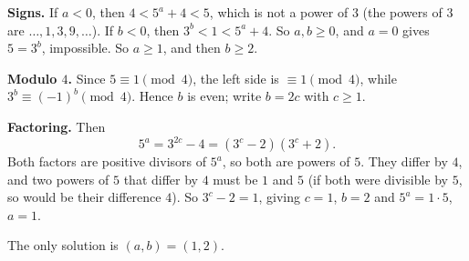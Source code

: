 \textbf{Signs.} If $a<0$, then $4<5^a+4<5$, which is not a power of $3$ (the powers of $3$ are $\dots,1,3,9,\dots$). If $b<0$, then $3^b<1<5^a+4$. So $a,b\ge0$, and $a=0$ gives $5=3^b$, impossible. So $a\ge1$, and then $b\ge2$.

\textbf{Modulo $4$.} Since $5\equiv1\pmod4$, the left side is $\equiv1\pmod4$, while $3^b\equiv(-1)^b\pmod4$. Hence $b$ is even; write $b=2c$ with $c\ge1$.

\textbf{Factoring.} Then
\[5^a=3^{2c}-4=(3^c-2)(3^c+2).\]
Both factors are positive divisors of $5^a$, so both are powers of $5$. They differ by $4$, and two powers of $5$ that differ by $4$ must be $1$ and $5$ (if both were divisible by $5$, so would be their difference $4$). So $3^c-2=1$, giving $c=1$, $b=2$ and $5^a=1\cdot5$, $a=1$.

The only solution is $\boxed{(a,b)=(1,2)}$.
